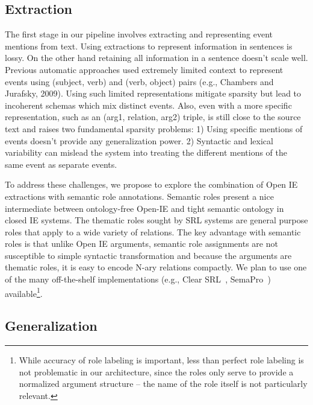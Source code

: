 \subsection{Extraction}

The first stage in our pipeline involves extracting and representing event mentions from text. Using extractions to represent information in sentences is lossy. On the other hand retaining all information in a sentence doesn't scale well. Previous automatic approaches used extremely limited context to represent events using (subject, verb) and (verb, object) pairs (e.g., Chambers and Jurafsky, 2009). Using such limited representations mitigate sparsity but lead to incoherent schemas which mix distinct events. Also, even with a more specific representation, such as an (arg1, relation, arg2) triple, is still close to the source text and raises two fundamental sparsity problems: 1) Using specific mentions of events doesn't provide any generalization power. 2) Syntactic and lexical variability can mislead the system into treating the different mentions of the same event as separate events. 

To address these challenges, we propose to explore the combination of Open IE extractions with semantic role annotations. Semantic roles present a nice intermediate between ontology-free Open-IE and tight semantic ontology in closed IE systems. The thematic roles sought by SRL systems are general purpose roles that apply to a wide variety of relations. The key advantage with semantic roles is that unlike Open IE arguments, semantic role assignments are not susceptible to simple syntactic transformation and because the arguments are thematic roles, it is easy to encode N-ary relations compactly. We plan to use one of the many off-the-shelf implementations (e.g., Clear SRL~\cite{}, SemaPro~\cite{}) available\footnote{While accuracy of role labeling is important, less than perfect role labeling is not problematic in our architecture, since the roles only serve to provide a normalized argument structure -- the name of the role itself is not particularly relevant.}. 

\subsection{Generalization}

